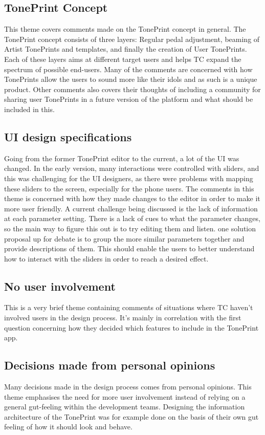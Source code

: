 \subsection*{TonePrint Concept}
\label{App:ThemeTonePrintConcept}
This theme covers comments made on the TonePrint concept in general. The TonePrint concept consists of three layers: Regular pedal adjustment, beaming of Artist TonePrints and templates, and finally the creation of User TonePrints. Each of these layers aims at different target users and helps TC expand the spectrum of possible end-users. Many of the comments are concerned with how TonePrints allow the users to sound more like their idols and as such is a unique product. Other comments also covers their thoughts of including a community for sharing user TonePrints in a future version of the platform and what should be included in this.

\subsection*{UI design specifications}
\label{App:ThemeParameterUI}
Going from the former TonePrint editor to the current, a lot of the UI was changed. In the early version, many interactions were controlled with sliders, and this was challenging for the UI designers, as there were problems with mapping these sliders to the screen, especially for the phone users. The comments in this theme is concerned with how they made changes to the editor in order to make it more user friendly. A current challenge being discussed is the lack of information at each parameter setting. There is a lack of cues to what the parameter changes, so the main way to figure this out is to try editing them and listen. one solution proposal up for debate is to group the more similar parameters together and provide descriptions of them. This should enable the users to better understand how to interact with the sliders in order to reach a desired effect.

\subsection*{No user involvement} 
\label{App:ThemeNoUserInvolvement}
This is a very brief theme containing comments of situations where TC haven't involved users in the design process. It's mainly in correlation with the first question concerning how they decided which features to include in the TonePrint app.

\subsection*{Decisions made from personal opinions} 
\label{App:ThemeDecisionsMadeFromPersonalOpinions}
Many decisions made in the design process comes from personal opinions. This theme emphasises the need for more user involvement instead of relying on a general gut-feeling within the development teams. Designing the information architecture of the TonePrint was for example done on the basis of their own gut feeling of how it should look and behave.

